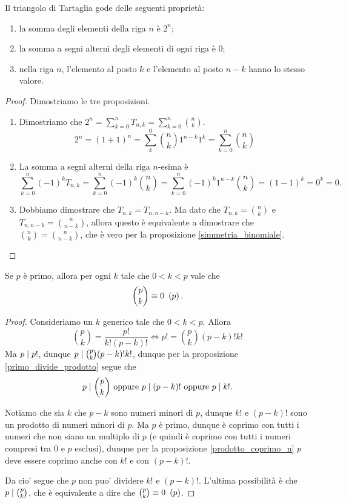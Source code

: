 \begin{proposition}
    Il triangolo di Tartaglia gode delle seguenti proprietà:
    \begin{enumerate}
        \item la somma degli elementi della riga $n$ è $2^n$;
        \item la somma a segni alterni degli elementi di ogni riga è $0$;
        \item nella riga $n$, l'elemento al posto $k$ e l'elemento al posto $n-k$ hanno lo stesso valore.
    \end{enumerate}
\end{proposition}
\begin{proof}
    Dimostriamo le tre proposizioni.
    \begin{enumerate}
        \item Dimostriamo che $2^n = \sum_{k=0}^n T_{n, k} = \sum_{k=0}^n \binom{n}{k}$.
        \[2^n = (1+1)^n = \sum_k^0 \binom{n}{k}1^{n-k}1^k = \sum_{k=0}^n \binom{n}{k}\]
        \item La somma a segni alterni della riga $n$-esima è \[\sum_{k=0}^n (-1)^kT_{n, k} = \sum_{k=0}^n (-1)^k\binom{n}{k} = \sum_{k=0}^n (-1)^k1^{n-k}\binom{n}{k} = (1-1)^k = 0^k = 0.\]
        \item Dobbiamo dimostrare che $T_{n, k} = T_{n, n-k}$. Ma dato che $T_{n, k} = \binom{n}{k}$ e $T_{n, n-k} = \binom{n}{n-k}$, allora questo è equivalente a dimostrare che $\binom{n}{k} = \binom{n}{n-k}$, che è vero per la proposizione \ref{simmetria_binomiale}. \qedhere
    \end{enumerate}
\end{proof}

\begin{proposition}\label{binomio_pk_divisibile_p}
    Se $p$ è primo, allora per ogni $k$ tale che $0 < k < p$ vale che
    \begin{equation}
        \binom{p}{k} \equiv 0 \ \left(p\right).
    \end{equation}
\end{proposition}
\begin{proof}
    Consideriamo un $k$ generico tale che $0 < k < p$.
    Allora \[
        \binom{p}{k} = \frac{p!}{k!(p-k)!} \iff p! = \binom{p}{k}(p-k)!k!    
    \]
    Ma $p \mid p!$, dunque $p \mid \binom{p}{k}(p-k)!k!$, dunque per la proposizione \ref{primo_divide_prodotto} segue che \[
        p \mid \binom{p}{k} \text{ oppure } p \mid (p-k)! \text{ oppure } p \mid k!
    .\]

    Notiamo che sia $k$ che $p-k$ sono numeri minori di $p$, dunque $k!$ e $(p-k)!$ sono un prodotto di numeri minori di $p$. Ma $p$ è primo, dunque è coprimo con tutti i numeri che non siano un multiplo di $p$ (e quindi è coprimo con tutti i numeri compresi tra $0$ e $p$ esclusi), dunque per la proposizione \ref{prodotto_coprimo_n} $p$ deve essere coprimo anche con $k!$ e con $(p-k)!$. 
    
    Da cio' segue che $p$ non puo' dividere $k!$ e $(p-k)!$.
    L'ultima possibilità è che $p \mid \binom{p}{k}$, che è equivalente a dire che $\binom{p}{k} \equiv 0 \ \left(p\right)$.
\end{proof}

